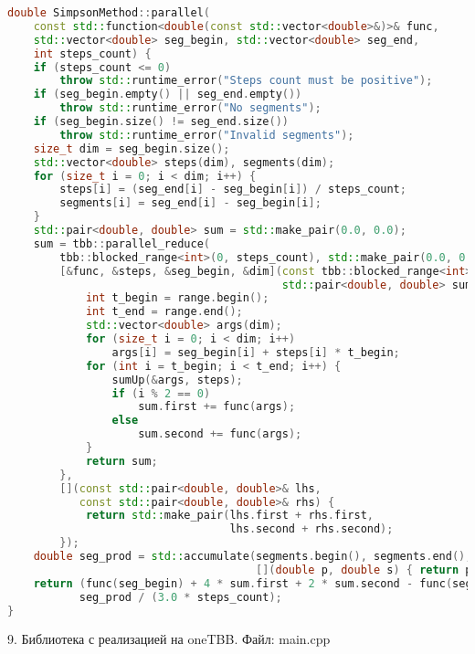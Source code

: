 \documentclass{report}
\begin{document}
\begin{lstlisting}[language=C++]
double SimpsonMethod::parallel(
    const std::function<double(const std::vector<double>&)>& func,
    std::vector<double> seg_begin, std::vector<double> seg_end,
    int steps_count) {
    if (steps_count <= 0)
        throw std::runtime_error("Steps count must be positive");
    if (seg_begin.empty() || seg_end.empty())
        throw std::runtime_error("No segments");
    if (seg_begin.size() != seg_end.size())
        throw std::runtime_error("Invalid segments");
    size_t dim = seg_begin.size();
    std::vector<double> steps(dim), segments(dim);
    for (size_t i = 0; i < dim; i++) {
        steps[i] = (seg_end[i] - seg_begin[i]) / steps_count;
        segments[i] = seg_end[i] - seg_begin[i];
    }
    std::pair<double, double> sum = std::make_pair(0.0, 0.0);
    sum = tbb::parallel_reduce(
        tbb::blocked_range<int>(0, steps_count), std::make_pair(0.0, 0.0),
        [&func, &steps, &seg_begin, &dim](const tbb::blocked_range<int>& range,
                                          std::pair<double, double> sum) {
            int t_begin = range.begin();
            int t_end = range.end();
            std::vector<double> args(dim);
            for (size_t i = 0; i < dim; i++)
                args[i] = seg_begin[i] + steps[i] * t_begin;
            for (int i = t_begin; i < t_end; i++) {
                sumUp(&args, steps);
                if (i % 2 == 0)
                    sum.first += func(args);
                else
                    sum.second += func(args);
            }
            return sum;
        },
        [](const std::pair<double, double>& lhs,
           const std::pair<double, double>& rhs) {
            return std::make_pair(lhs.first + rhs.first,
                                  lhs.second + rhs.second);
        });
    double seg_prod = std::accumulate(segments.begin(), segments.end(), 1.0,
                                      [](double p, double s) { return p * s; });
    return (func(seg_begin) + 4 * sum.first + 2 * sum.second - func(seg_end)) *
           seg_prod / (3.0 * steps_count);
}
\end{lstlisting}

\par 9. Библиотека с реализацией на oneTBB. Файл: main.cpp
\end{document}
